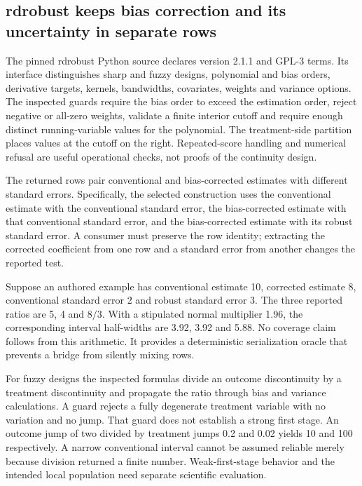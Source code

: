 \subsection{rdrobust keeps bias correction and its uncertainty in separate rows}
The pinned rdrobust Python source declares version 2.1.1 and GPL-3 terms.
Its interface distinguishes sharp and fuzzy designs, polynomial and bias
orders, derivative targets, kernels, bandwidths, covariates, weights and
variance options. The inspected guards require the bias order to exceed
the estimation order, reject negative or all-zero weights, validate a
finite interior cutoff and require enough distinct running-variable values
for the polynomial. The treatment-side partition places values at the
cutoff on the right. Repeated-score handling and numerical refusal are
useful operational checks, not proofs of the continuity design.
\citep{exec25_pyrdiv_rdrobust}

The returned rows pair conventional and bias-corrected estimates with
different standard errors. Specifically, the selected construction uses
the conventional estimate with the conventional standard error, the
bias-corrected estimate with that conventional standard error, and the
bias-corrected estimate with its robust standard error. A consumer must
preserve the row identity; extracting the corrected coefficient from one
row and a standard error from another changes the reported test.
\citep{exec25_pyrdiv_rdrobust}

Suppose an authored example has conventional estimate 10, corrected
estimate 8, conventional standard error 2 and robust standard error 3.
The three reported ratios are 5, 4 and $8/3$. With a stipulated normal
multiplier 1.96, the corresponding interval half-widths are 3.92, 3.92
and 5.88. No coverage claim follows from this arithmetic. It provides a
deterministic serialization oracle that prevents a bridge from silently
mixing rows.~\citep{exec25_pyrdiv_choice}

For fuzzy designs the inspected formulas divide an outcome discontinuity
by a treatment discontinuity and propagate the ratio through bias and
variance calculations. A guard rejects a fully degenerate treatment
variable with no variation and no jump. That guard does not establish a
strong first stage. An outcome jump of two divided by treatment jumps
0.2 and 0.02 yields 10 and 100 respectively. A narrow conventional interval
cannot be assumed reliable merely because division returned a finite
number. Weak-first-stage behavior and the intended local population need
separate scientific evaluation.~\citep{exec25_pyrdiv_rdrobust,
exec25_pyrdiv_choice}

